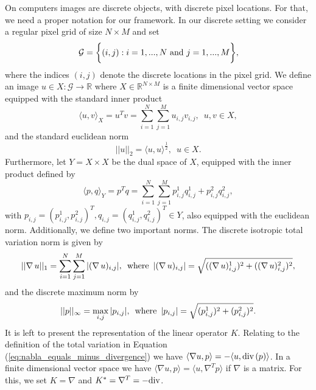 \documentclass[abstracton]{scrreprt}
\begin{document}
        On computers images are discrete objects, with discrete pixel locations. For that, we need a proper notation for our framework. In our discrete setting we consider a regular pixel grid of size $N \times M$ and set
            \begin{equation}
                \mathcal{G} = \bigg\{ (i, j) : i = 1, ..., N \,\, \textnormal{and} \,\, j = 1, ..., M \bigg\},
                \label{eq:pixel_grid}
            \end{equation}
        where the indices $(i, j)$ denote the discrete locations in the pixel grid. We define an image $u \in X: \mathcal{G} \longrightarrow \mathbb{R}$ where $X \in \mathbb{R}^{N \times M}$ is a finite dimensional vector space equipped with the standard inner product
            \begin{equation}
                \langle u, v \rangle_{X} = u^{T}v = \sum_{i = 1}^{N} \sum_{j = 1}^{M} u_{i, j} v_{i, j}, \,\,\, u, v \in X,
                \label{eq:inner_product}
            \end{equation}
        and the standard euclidean norm
            $$
                ||u||_{2} = \langle u, u \rangle^{\frac{1}{2}}, \,\,\, u \in X.
            $$
        Furthermore, let $Y = X \times X$ be the dual space of $X$, equipped with the inner product defined by
            \begin{equation}
                \langle p, q \rangle_{Y} = p^{T}q = \sum_{i = 1}^{N} \sum_{j = 1}^{M} p^{1}_{i, j} q^{1}_{i, j} + p^{2}_{i, j} q^{2}_{i, j},
                \label{eq:inner_product_space_y}
            \end{equation}
        with $p_{i, j} = \left(p^{1}_{i, j}, p^{2}_{i, j}\right)^{T}, q_{i, j} = \left(q^{1}_{i, j}, q^{2}_{i, j}\right)^{T} \in Y$, also equipped with the euclidean norm. Additionally, we define two important norms. The discrete isotropic total variation norm is given by
            $$
                ||\nabla \, u||_{1} = \sum_{i = 1}^{N} \sum_{j = 1}^{M} |(\nabla \, u)_{i, j}|, \,\,\, \textnormal{where} \,\,\, |(\nabla \, u)_{i, j}| = \sqrt{((\nabla \, u)^{1}_{i, j})^{2} + ((\nabla \, u)^{2}_{i, j})^{2}},
            $$
        and the discrete maximum norm by
            $$
                ||p||_{\infty} = \max_{i, j} |p_{i, j}|, \,\,\, \textnormal{where} \,\,\, |p_{i, j}| = \sqrt{(p^{1}_{i, j})^{2} + (p^{2}_{i, j})^{2}}.
            $$
        It is left to present the representation of the linear operator $K$. Relating to the definition of the total variation in Equation (\ref{eq:nabla_equals_minus_divergence}) we have $\langle \nabla u, p \rangle = - \langle u, \textnormal{div}\,(p) \rangle$. In a finite dimensional vector space we have $\langle \nabla u, p \rangle = \langle u, \nabla^{T} p \rangle$ if $\nabla$ is a matrix. For this, we set $K = \nabla$ and $K^{\ast} = \nabla^{T} = -\textnormal{div}$.
\end{document}
